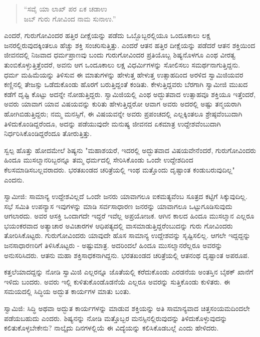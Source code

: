 \begin{verse}
“ಸವೈ ಯಾ ಲಾಖ್ ಪರ ಏಕ ಚಡಾಉ\\ಜಬ್ ಗುರು ಗೋವಿಂದ ನಾಮ ಸುನಾಉ.”
\end{verse}

ಎಂದರೆ, ಗುರುಗೋವಿಂದರ ಹತ್ತಿರ ದೀಕ್ಷೆಯನ್ನು ಪಡೆದು ಒಬ್ಬೊಬ್ಬರಲ್ಲಿಯೂ ಒಂದೂಕಾಲು ಲಕ್ಷ ಜನರಲ್ಲಿರುವುದಕ್ಕಿಂತಲೂ ಹೆಚ್ಚು ಶಕ್ತಿ ಸಂಚರಿಸುತ್ತಿತ್ತು. ಎಂದರೆ ಆತನ ಹತ್ತಿರ ದೀಕ್ಷೆಯನ್ನು ಪಡೆದರೆ ಆತನ ಶಕ್ತಿಯಿಂದ ಜೀವನದಲ್ಲಿ ನಿಜವಾದ ಧರ್ಮಪ್ರಾಣವು ಬಂದು ಗುರುಗೋವಿಂದರ ಪ್ರತಿಯೊಬ್ಬ ಶಿಷ್ಯನೊಳಗೂ ಎಂಥ ವೀರತ್ವ ತುಂಬಿಕೊಳ್ಳುತ್ತಿತ್ತೆಂದರೆ, ಅವನು ಆಗ ಒಂದೂಕಾಲು ಲಕ್ಷ ವಿಧರ್ಮಿಗಳನ್ನು ಸೋಲಿಸಲು ಸಮರ್ಥನಾಗುತ್ತಿದ್ದನು. ಧರ್ಮ ಮಹಿಮೆಯನ್ನು ತಿಳಿಸುವ ಈ ಮಾತುಗಳನ್ನು ಹೇಳುತ್ತ ಹೇಳುತ್ತ ಉತ್ಸಾಹದಿಂದ ಅರಳಿದ ಸ್ವಾಮಿಜಿಯವರ ಕಣ್ಣಿನಲ್ಲಿ ತೇಜಸ್ಸು ಒಡೆದುಕೊಂಡು ಹೊರಗೆ ಬರುತ್ತಿದ್ದಂತೆ ಕಂಡಿತು. ಕೇಳುತ್ತಿದ್ದವರು ಬೆರಗಾಗಿ ಸ್ವಾಮೀಜಿ ಮುಖದ ಕಡೆಗೆ ದೃಷ್ಟಿ ಕೊಟ್ಟು ಅದನ್ನೇ ನೋಡುತ್ತಿದ್ದರು. ಸ್ವಾಮಿಜಿಯಲ್ಲಿ ಎಂಥ ಅದ್ಭುತವಾದ ಉತ್ಸಾಹವೂ ಶಕ್ತಿಯೂ ಇತ್ತೆಂದರೆ, ಅವರು ಯಾವಾಗ ಯಾವ ವಿಷಯವನ್ನು ಕುರಿತು ಹೇಳುತ್ತಿದ್ದರೋ ಆವಾಗ ಅವರು ಅದರಲ್ಲಿ ಅಷ್ಟು ತನ್ಮಯರಾಗಿ ಹೋಗಿಬಿಡುತ್ತಿದ್ದರು; ನಮ್ಮ ಮನಸ್ಸಿಗೆ, ಈ ವಿಷಯವನ್ನೇ ಅವರು ಪ್ರಪಂಚದಲ್ಲಿ ಎಲ್ಲಕ್ಕಿಂತಲೂ ಶ್ರೇಷ್ಠವೆಂಬುದಾಗಿ ತಿಳಿದುಕೊಂಡಿದ್ದರೆಂದೂ, ಅದನ್ನು ಪಡೆಯುವುದೇ ಮನುಷ್ಯ ಜೀವನದ ಏಕಮಾತ್ರ ಉದ್ದೇಶವೆಂಬುದಾಗಿ ನಿರ್ಧರಿಸಿಕೊಂಡಿದ್ದರೆಂದೂ ತೋರುತ್ತಿತ್ತು.

ಸ್ವಲ್ಪ ಹೊತ್ತು ಹೋದಮೇಲೆ ಶಿಷ್ಯನು "ಮಹಾಶಯರೆ, ಇದರಲ್ಲಿ ಅದ್ಭುತವಾದ ವಿಷಯವೇನೆಂದರೆ, ಗುರುಗೋವಿಂದರು ಹಿಂದೂ ಮುಸಲ್ಮಾನರಿಬ್ಬರನ್ನೂ ತಮ್ಮ ಧರ್ಮದಲ್ಲಿ ಸೇರಿಸಿಕೊಂಡು ಒಂದೇ ಉದ್ದೇಶದಿಂದ ಕೆಲಸಮಾಡಿಸಬಲ್ಲವರಾದರು. ಭರತಖಂಡದ ಚರಿತ್ರೆಯಲ್ಲಿ ಇಂಥ ಮತ್ತೊಂದು ದೃಷ್ಟಾಂತ ಕಂಡುಬರುವುದಿಲ್ಲ" ಎಂದನು.

ಸ್ವಾಮೀಜಿ: ಸಾಮಾನ್ಯ ಉದ್ದೇಶವಿಲ್ಲದೆ ಒಂದೇ ಜನರು ಯಾವಾಗಲೂ ಐಕಮತ್ಯವೆಂಬ ಸೂತ್ರದ ಕಟ್ಟಿಗೆ ಸಿಕ್ಕುವುದಿಲ್ಲ. ಸಭೆ ಸಮಿತಿ ಉಪನ್ಯಾಸ ಇವುಗಳನ್ನು ಮಾಡಿ ಸರ್ವಸಾಧಾರಣ ಜನರನ್ನು ಯಾವಾಗಲೂ ಒಟ್ಟುಗೂಡಿಸುವುದು ಆಗಲಾರದು. ಅವರ ಆಸಕ್ತಿ ಒಂದಾಗದೇ ಇದ್ದರೆ ಇವೆಲ್ಲ ಅಪ್ರಯೋಜಕ. ಆಗಿನ ಕಾಲದ ಹಿಂದೂ ಮುಸಲ್ಮಾನ ಎಲ್ಲರೂ ಭಯಂಕರವಾದ ಅತ್ಯಾಚಾರ ಅವಿಚಾರಗಳ ಆಧಿಪತ್ಯದಲ್ಲಿ ವಾಸಮಾಡುತ್ತಿದ್ದರೆಂಬುದನ್ನು ಗುರು ಗೋವಿಂದರು ತೋರಿಸಿಕೊಟ್ಟರು. ಗುರುಗೋವಿಂದರು ಯಾವುದೇ ಹೊಸ ಸಾಮಾನ್ಯ ಉದ್ದೇಶವನ್ನು ಸೃಷ್ಟಿಸಲಿಲ್ಲ. ಆಗಲೇ ಇದ್ದದ್ದನ್ನು ಜನಸಾಧಾರಣರಿಗೆ ತಿಳಿಸಿಕೊಟ್ಟರು - ಅಷ್ಟುಮಾತ್ರ. ಅದರಿಂದಲೆ ಹಿಂದೂ ಮುಸಲ್ಮಾನರೆಲ್ಲರೂ ಅವರನ್ನು ಅನುಸರಿಸಿದರು. ಆತನು ಮಹಾ ಶಕ್ತಿಸಾಧಕನಾಗಿದ್ದನು. ಭರತಖಂಡದ ಚರಿತ್ರೆಯಲ್ಲಿ ಆತನಂಥ ದೃಷ್ಟಾಂತ ಅಪರೂಪ.

ಕತ್ತಲೆಯಾದದ್ದನ್ನು ನೋಡಿ ಸ್ವಾಮಿಜಿ ಎಲ್ಲರನ್ನೂ ಜೊತೆಯಲ್ಲಿ ಕರೆದುಕೊಂಡು ಎರಡನೆಯ ಅಂತಸ್ತಿನ ಬೈಠಕ್ ಖಾನೆಗೆ ಇಳಿದು ಬಂದರು. ಅವರು ಇಲ್ಲಿ ಕುಳಿತುಕೊಂಡೊಡನೆಯೆ ಎಲ್ಲರೂ ಅವರನ್ನು ಸುತ್ತಿಕೊಂಡು ಕುಳಿತರು. ಈ ಸಮಯದಲ್ಲಿ ಸಿದ್ಧಿಯ ಅದ್ಭುತ ಕಾರ್ಯಗಳ ಮಾತು ಬಂತು.

ಸ್ವಾಮಿಜಿ: ಸಿದ್ಧಿ ಅಥವಾ ಅದ್ಭುತ ಕಾರ್ಯಗಳನ್ನು ಮಾಡುವ ಶಕ್ತಿಯನ್ನು ಅತಿ ಸಾಮಾನ್ಯವಾದ ಚಿತ್ತಸಂಯಮದಿಂದಲೇ ಪಡೆಯಬಹುದು ಎಂದರು. ಶಿಷ್ಯನನ್ನು ನೋಡಿ ಮತ್ತೊಬ್ಬರ ಮನಸ್ಸಿನಲ್ಲಿರುವುದನ್ನು ತಿಳಿದುಕೊಳ್ಳುವುದನ್ನು ಕಲಿತುಕೊಳ್ಳಬೇಕೇನು? ನಾಲ್ಕೈದು ದಿನಗಳಲ್ಲಿಯೆ ಈ ವಿದ್ಯೆಯನ್ನು ಕಲಿಸಿಕೊಡಬಲ್ಲೆ ಎಂದು ಹೇಳಿದರು.

